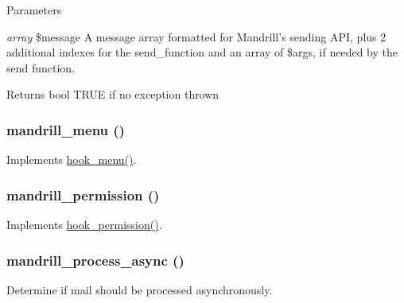 \begin{DoxyParams}{Parameters}
\item[{\em array}]\$message A message array formatted for Mandrill's sending API, plus 2 additional indexes for the send\_\-function and an array of \$args, if needed by the send function.\end{DoxyParams}
\begin{DoxyReturn}{Returns}
bool TRUE if no exception thrown 
\end{DoxyReturn}
\hypertarget{mandrill_8module_ab717377383339b55b058af1f4bb87fef}{
\subsubsection[{mandrill\_\-menu}]{\setlength{\rightskip}{0pt plus 5cm}mandrill\_\-menu ()}}
\label{mandrill_8module_ab717377383339b55b058af1f4bb87fef}
Implements \hyperlink{group__hooks_ga5c95244fea59b25666e409759e133ded}{hook\_\-menu()}. \hypertarget{mandrill_8module_aef9ed053e9f12225ca85eab6d7f93647}{
\subsubsection[{mandrill\_\-permission}]{\setlength{\rightskip}{0pt plus 5cm}mandrill\_\-permission ()}}
\label{mandrill_8module_aef9ed053e9f12225ca85eab6d7f93647}
Implements \hyperlink{group__hooks_ga2b22b45f4925f2478412477bae329713}{hook\_\-permission()}. \hypertarget{mandrill_8module_a087c8f74e44d40dcb13cbc3072b1cd93}{
\subsubsection[{mandrill\_\-process\_\-async}]{\setlength{\rightskip}{0pt plus 5cm}mandrill\_\-process\_\-async ()}}
\label{mandrill_8module_a087c8f74e44d40dcb13cbc3072b1cd93}
Determine if mail should be processed asynchronously.


